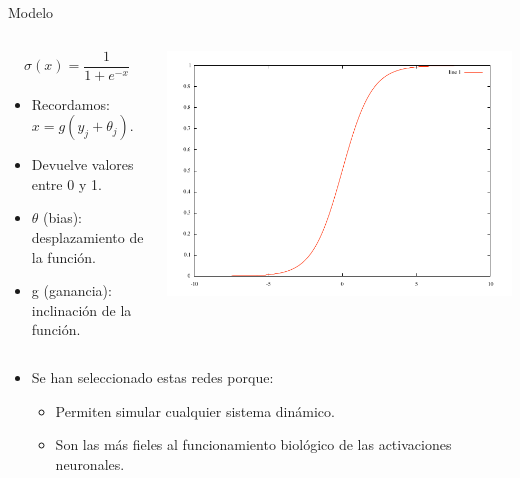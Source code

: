 \documentclass[aspectratio=169]{beamer}
\begin{document}
\begin{frame}{Modelo}
  \begin{columns}
    \begin{column}{0.47\textwidth}
      \vspace{1cm}
      \begin{equation*}
        \sigma (x)=\frac{1}{1+e^{-x}}
      \end{equation*}
        \begin{itemize}
          \item Recordamos: $x = g(y_{j} + \theta_{j})$.
          \item Devuelve valores entre 0 y 1.
          \item $\theta$ (bias): desplazamiento de la función.
          \item g (ganancia): inclinación de la función.
        \end{itemize}
    \end{column}
    \begin{column}{0.5\textwidth}
      \includegraphics[width=1.0\textwidth,height=.50\textheight]{Imagenes/Sigmoid}
    \end{column}
  \end{columns}
  \begin{itemize}
    \item Se han seleccionado estas redes porque:
    \begin{itemize}
      \item Permiten simular cualquier sistema dinámico.
      \item Son las más fieles al funcionamiento biológico de las activaciones neuronales.
    \end{itemize}
  \end{itemize}
\end{frame}
\end{document}
